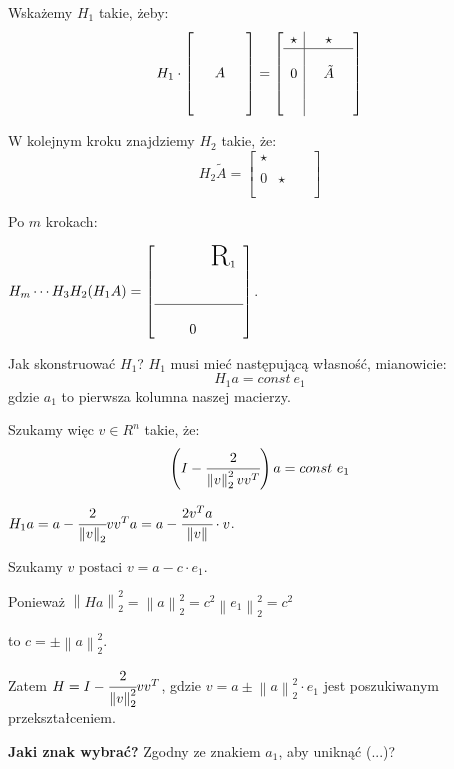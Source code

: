 \documentclass[hidelinks,a4paper,fleqn]{article}
\newcommand{\norm}[1]{\left\lVert#1\right\rVert}
\begin{document}
Wskażemy $H_1$ takie, żeby:
\[
H_1 \cdot \left[ \begin{array}{c}\\ \\ \quad A \quad \\ \\ \ \end{array} \right] = 
\left[ \begin{array}{c|c}\star & \quad \star \quad \\ \hline \\ 0 & \tilde{A}\\ & \\ & \end{array}\right]
\]

W kolejnym kroku znajdziemy $H_2$ takie, że:
\[
H_2 \tilde{A} = \left[ \begin{array}{c|c}\star & \quad  \quad \\  \\ 0 & \star \\ & \\ & \end{array}\right]
\]

Po $m$ krokach:

$H_m \cdots H_3 H_2 (H_1 A) = \left[ \begin{array}{ccc} & & \text{\huge R}_1 \\ \\ \\ \hline \\ & \quad 0 & \end{array}\right]$.

Jak skonstruować $H_1$? $H_1$ musi mieć następującą własność, mianowicie:
\[
	H_1 a = const\ e_1
\]
gdzie $a_1$ to pierwsza kolumna naszej macierzy.

Szukamy więc $v \in R^n$ takie, że:
\[
	\left(I - \cfrac{2}{\norm{v}_2^2 vv^T}\right)a = const\ e_1
\]

$H_1a = a - \cfrac{2}{\norm{v}_2} v v^Ta = a - \cfrac{2v^Ta}{\norm{v}} \cdot v$.

Szukamy $v$ postaci $v = a - c\cdot e_1$.

Ponieważ $\norm{Ha}_2^2 = \norm{a}^2_2 = c^2 \norm{e_1}^2_2 = c^2$

to $c = \pm \norm{a} ^2_2$.


Zatem $H = I - \cfrac{2}{\norm{v}_2^2} vv^T$, gdzie $v = a \pm \norm{a}_2^2 \cdot e_1$ jest poszukiwanym przekształceniem.

\textbf{Jaki znak wybrać?} Zgodny ze znakiem $a_1$, aby uniknąć (...)?
\end{document}
